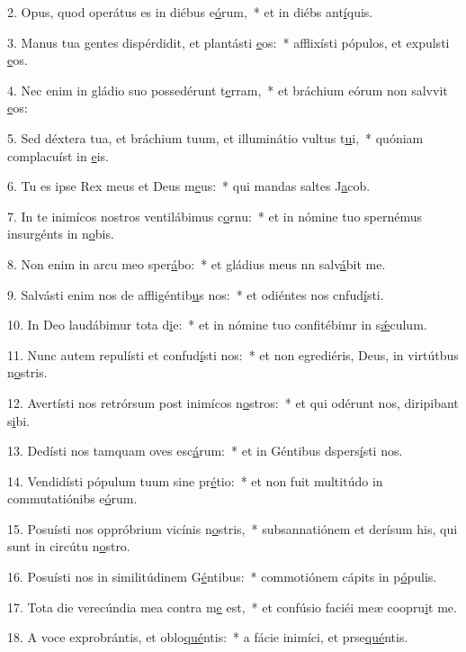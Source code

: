 2. Opus, quod operátus es in diébus e\uline{ó}rum,~* et in diébs ant\uline{í}quis.\par 
3. Manus tua gentes dispérdidit, et plantásti \uline{e}os:~* afflixísti pópulos, et expulsti \uline{e}os.\par 
4. Nec enim in gládio suo possedérunt t\uline{e}rram,~* et bráchium eórum non salvvit \uline{e}os:\par 
5. Sed déxtera tua, et bráchium tuum, et illuminátio vultus t\uline{u}i,~* quóniam complacuíst in \uline{e}is.\par 
6. Tu es ipse Rex meus et Deus m\uline{e}us:~* qui mandas saltes J\uline{a}cob.\par 
7. In te inimícos nostros ventilábimus c\uline{o}rnu:~* et in nómine tuo spernémus insurgénts in n\uline{o}bis.\par 
8. Non enim in arcu meo sper\uline{á}bo:~* et gládius meus nn salv\uline{á}bit me.\par 
9. Salvásti enim nos de affligéntib\uline{u}s nos:~* et odiéntes nos cnfud\uline{í}sti.\par 
10. In Deo laudábimur tota d\uline{i}e:~* et in nómine tuo confitébimr in s\uline{ǽ}culum.\par 
11. Nunc autem repulísti et confud\uline{í}sti nos:~* et non egrediéris, Deus, in virtútbus n\uline{o}stris.\par 
12. Avertísti nos retrórsum post inimícos n\uline{o}stros:~* et qui odérunt nos, diripibant s\uline{i}bi.\par 
13. Dedísti nos tamquam oves esc\uline{á}rum:~* et in Géntibus dspers\uline{í}sti nos.\par 
14. Vendidísti pópulum tuum sine pr\uline{é}tio:~* et non fuit multitúdo in commutatiónibs e\uline{ó}rum.\par 
15. Posuísti nos oppróbrium vicínis n\uline{o}stris,~* subsannatiónem et derísum his, qui sunt in circútu n\uline{o}stro.\par 
16. Posuísti nos in similitúdinem G\uline{é}ntibus:~* commotiónem cápits in p\uline{ó}pulis.\par 
17. Tota die verecúndia mea contra m\uline{e} est,~* et confúsio faciéi meæ coopru\uline{i}t me.\par 
18. A voce exprobrántis, et oblo\uline{qué}ntis:~* a fácie inimíci, et prse\uline{qué}ntis.\par 
